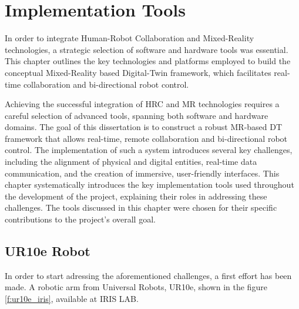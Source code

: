 

\chapter{Implementation Tools}%
\label{chapter:tools}



\begin{introduction}
    In order to integrate Human-Robot Collaboration and Mixed-Reality technologies, a strategic selection of software and hardware tools was essential. This chapter outlines the key technologies and platforms employed to build the conceptual Mixed-Reality based Digital-Twin framework, which facilitates real-time collaboration and bi-directional robot control.
\end{introduction}

Achieving the successful integration of \ac{HRC} and \ac{MR} technologies requires a careful selection of advanced tools, spanning both software and hardware domains. The goal of this dissertation is to construct a robust \ac{MR}-based \ac{DT} framework that allows real-time, remote collaboration and bi-directional robot control. The implementation of such a system introduces several key challenges, including the alignment of physical and digital entities, real-time data communication, and the creation of immersive, user-friendly interfaces. This chapter systematically introduces the key implementation tools used throughout the development of the project, explaining their roles in addressing these challenges. 
The tools discussed in this chapter were chosen for their specific contributions to the project’s overall goal. 

\section{UR10e Robot}

In order to start adressing the aforementioned challenges, a first effort has been made. A robotic arm from Universal Robots, UR10e, shown in the figure \ref{f:ur10e_iris}, available at IRIS LAB.

